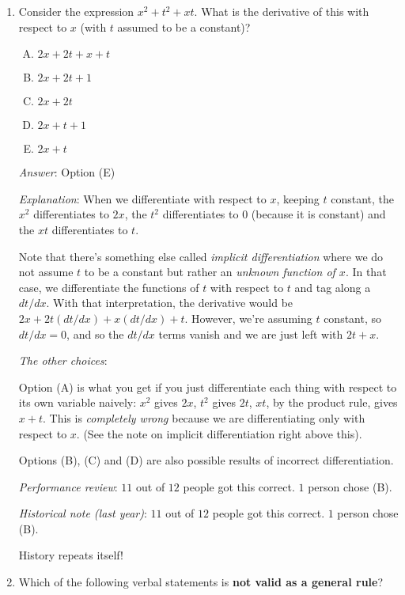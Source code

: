 \documentclass[10pt]{amsart}
\begin{document}
\begin{enumerate}

\item Consider the expression $x^2 + t^2 + xt$. What is the derivative
  of this with respect to $x$ (with $t$ assumed to be a constant)?


  \begin{enumerate}[(A)]

  \item $2x + 2t + x + t$
  \item $2x + 2t + 1$
  \item $2x + 2t$
  \item $2x + t + 1$
  \item $2x + t$
  \end{enumerate}

  {\em Answer}: Option (E)

  {\em Explanation}: When we differentiate with respect to $x$,
  keeping $t$ constant, the $x^2$ differentiates to $2x$, the $t^2$
  differentiates to $0$ (because it is constant) and the $xt$
  differentiates to $t$.

  Note that there's something else called {\em implicit
  differentiation} where we do not assume $t$ to be a constant but
  rather an {\em unknown function of $x$}. In that case, we
  differentiate the functions of $t$ with respect to $t$ and tag along
  a $dt/dx$. With that interpretation, the derivative would be $2x +
  2t(dt/dx) + x(dt/dx) + t$. However, we're assuming $t$ constant, so
  $dt/dx = 0$, and so the $dt/dx$ terms vanish and we are just left
  with $2t + x$.

  {\em The other choices}:

  Option (A) is what you get if you just differentiate each thing with
  respect to its own variable naively: $x^2$ gives $2x$, $t^2$ gives
  $2t$, $xt$, by the product rule, gives $x + t$. This is {\em
  completely wrong} because we are differentiating only with respect
  to $x$. (See the note on implicit differentiation right above this).

  Options (B), (C) and (D) are also possible results of incorrect
  differentiation.

  {\em Performance review}: $11$ out of $12$ people got this
  correct. $1$ person chose (B).

  {\em Historical note (last year)}: $11$ out of $12$ people got this
  correct. $1$ person chose (B).

  History repeats itself!

\item Which of the following verbal statements is {\bf not valid as a
  general rule}?


\end{enumerate}
\end{document}
